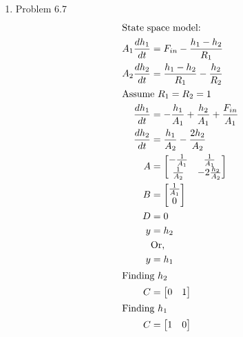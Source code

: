\documentclass[12pt]{article}
\begin{document}
\begin{enumerate}
\newpage
\item Problem 6.7
\begin{align*}
    \intertext{State space model:}
    A_1 \frac{dh_1}{dt} &= F_{in} - \frac{h_1 - h_2}{R_1} \\
    A_2 \frac{dh_2}{dt} &= \frac{h_1 - h_2}{R_1} - \frac{h_2}{R_2} \\
    \intertext{Assume $R_1 = R_2 = 1$}
    \frac{dh_1}{dt} &= - \frac{h_1}{A_1} + \frac{h_2}{A_1} + \frac{F_{in}}{A_1} \\
    \frac{dh_2}{dt} &= \frac{h_1}{A_2} - \frac{2 h_2}{A_2} \\
    A &= \begin{bmatrix}
        - \frac{1}{A_1} & \frac{1}{A_1} \\
        \frac{1}{A_2} & - 2 \frac{h_2}{A_2} \\
    \end{bmatrix} \\
    B &= \begin{bmatrix}
        \frac{1}{A_1} \\
        0 \\
    \end{bmatrix} \\
    D &= 0 \\
    y &= h_2 \\
    & \text{Or,} \\
    y &= h_1 \\
    \intertext{Finding $h_2$}
    C &= \begin{bmatrix}
        0 & 1 \\
    \end{bmatrix} \\
    \intertext{Finding $h_1$}
    C &= \begin{bmatrix}
        1 & 0 \\
    \end{bmatrix} \\
\end{align*}


\end{enumerate}
\end{document}
